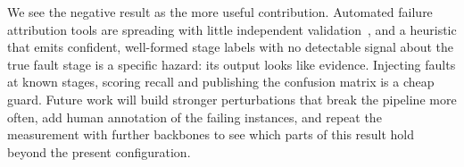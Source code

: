 \documentclass{llncs}
\begin{document}
We see the negative result as the more useful contribution. Automated failure
attribution tools are spreading with little independent
validation~\cite{zhang2025which,cemri_mast_2025}, and a heuristic that emits
confident, well-formed stage labels with no detectable signal about the true
fault stage is a specific hazard: its output looks like evidence. Injecting
faults at known stages, scoring recall and publishing the confusion matrix is
a cheap guard. Future work will build stronger perturbations that break the
pipeline more often, add human annotation of the failing instances, and repeat
the measurement with further backbones to see which parts of this result hold
beyond the present configuration.



\end{document}
